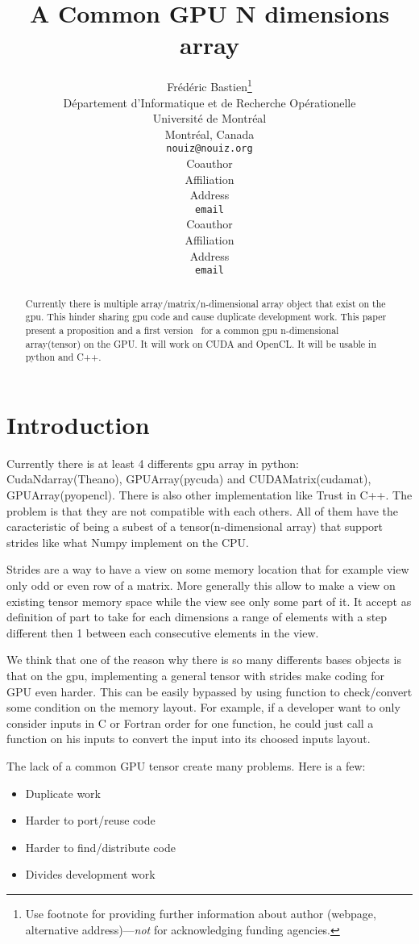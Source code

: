 \documentclass{article} %
\title{A Common GPU N dimensions array}
\author{
Frédéric Bastien\thanks{ Use footnote for providing further information
about author (webpage, alternative address)---\emph{not} for acknowledging
funding agencies.} \\
D\'epartement d'Informatique et de Recherche Op\'erationelle\\
Universit\'e de Montr\'eal\\
Montr\'eal, Canada \\
\texttt{nouiz@nouiz.org} \\
\And
Coauthor \\
Affiliation \\
Address \\
\texttt{email} \\
\AND
Coauthor \\
Affiliation \\
Address \\
\texttt{email} \\
}
\begin{document}
\maketitle

\begin{abstract}
Currently there is multiple array/matrix/n-dimensional array
object that exist on the gpu.  This hinder sharing gpu code and cause
duplicate development work. This paper present a proposition and a
first version~\citep{GpuNdArray} for a common gpu n-dimensional array(tensor) on the GPU. It will
work on CUDA and OpenCL. It will be usable in python and C++.
\end{abstract}

\section{Introduction}
Currently there is at least 4 differents gpu array in python:
CudaNdarray(Theano), GPUArray(pycuda) and CUDAMatrix(cudamat),
GPUArray(pyopencl). There is also other implementation like Trust in
C++.  The problem is that they are not compatible with each
others. All of them have the caracteristic of being a subest of a
tensor(n-dimensional array) that support strides like what Numpy
implement on the CPU.  

Strides are a way to have a view on some memory location that for
example view only odd or even row of a matrix. More generally this
allow to make a view on existing tensor memory space while the view
see only some part of it. It accept as definition of part to take for
each dimensions a range of elements with a step different then 1
between each consecutive elements in the view.

We think that one of the reason why there is so many differents bases
objects is that on the gpu, implementing a general tensor with strides
make coding for GPU even harder. This can be easily bypassed by using
function to check/convert some condition on the memory layout. For
example, if a developer want to only consider inputs in C or Fortran order
for one function, he could just call a function on his inputs to convert the input
into its choosed inputs layout.

The lack of a common GPU tensor create many problems. Here is a few:
\begin{itemize}
  \item Duplicate work
  \item Harder to port/reuse code
  \item Harder to find/distribute code
  \item Divides development work
\end{itemize}
\end{document}
